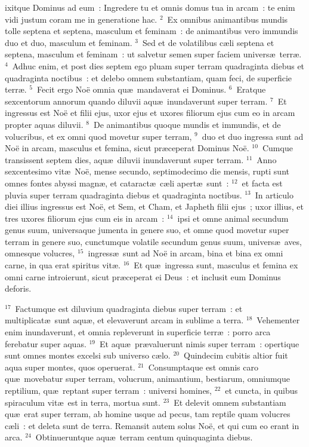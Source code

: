 \bchapter
{}ixitque Dominus ad eum~: Ingredere tu et omnis domus tua in arcam~: te enim vidi justum coram me in generatione hac.
${}^{2}$~Ex omnibus animantibus mundis tolle septena et septena, masculum et feminam~: de animantibus vero immundis duo et duo, masculum et feminam.
${}^{3}$~Sed et de volatilibus c\ae li septena et septena, masculum et feminam~: ut salvetur semen super faciem univers\ae\ terr\ae .
${}^{4}$~Adhuc enim, et post dies septem ego pluam super terram quadraginta diebus et quadraginta noctibus~: et delebo omnem substantiam, quam feci, de superficie terr\ae .
${}^{5}$~Fecit ergo No\"e omnia qu\ae\ mandaverat ei Dominus.
${}^{6}$~Eratque sexcentorum annorum quando diluvii aqu\ae\ inundaverunt super terram.
${}^{7}$~Et ingressus est No\"e et filii ejus, uxor ejus et uxores filiorum ejus cum eo in arcam propter aquas diluvii.
${}^{8}$~De animantibus quoque mundis et immundis, et de volucribus, et ex omni quod movetur super terram,
${}^{9}$~duo et duo ingressa sunt ad No\"e in arcam, masculus et femina, sicut pr\ae ceperat Dominus No\"e.
${}^{10}$~Cumque transissent septem dies, aqu\ae\ diluvii inundaverunt super terram.
${}^{11}$~Anno sexcentesimo vit\ae\ No\"e, mense secundo, septimodecimo die mensis, rupti sunt omnes fontes abyssi magn\ae , et cataract\ae\ c\ae li apert\ae\ sunt~:
${}^{12}$~et facta est pluvia super terram quadraginta diebus et quadraginta noctibus.
${}^{13}$~In articulo diei illius ingressus est No\"e, et Sem, et Cham, et Japheth filii ejus~; uxor illius, et tres uxores filiorum ejus cum eis in arcam~:
${}^{14}$~ipsi et omne animal secundum genus suum, universaque jumenta in genere suo, et omne quod movetur super terram in genere suo, cunctumque volatile secundum genus suum, univers\ae\ aves, omnesque volucres,
${}^{15}$~ingress\ae\ sunt ad No\"e in arcam, bina et bina ex omni carne, in qua erat spiritus vit\ae .
${}^{16}$~Et qu\ae\ ingressa sunt, masculus et femina ex omni carne introierunt, sicut pr\ae ceperat ei Deus~: et inclusit eum Dominus deforis.


${}^{17}$~Factumque est diluvium quadraginta diebus super terram~: et multiplicat\ae\ sunt aqu\ae , et elevaverunt arcam in sublime a terra.
${}^{18}$~Vehementer enim inundaverunt, et omnia repleverunt in superficie terr\ae~: porro arca ferebatur super aquas.
${}^{19}$~Et aqu\ae\ pr\ae valuerunt nimis super terram~: opertique sunt omnes montes excelsi sub universo c\ae lo.
${}^{20}$~Quindecim cubitis altior fuit aqua super montes, quos operuerat.
${}^{21}$~Consumptaque est omnis caro qu\ae\ movebatur super terram, volucrum, animantium, bestiarum, omniumque reptilium, qu\ae\ reptant super terram~: universi homines,
${}^{22}$~et cuncta, in quibus spiraculum vit\ae\ est in terra, mortua sunt.
${}^{23}$~Et delevit omnem substantiam qu\ae\ erat super terram, ab homine usque ad pecus, tam reptile quam volucres c\ae li~: et deleta sunt de terra. Remansit autem solus No\"e, et qui cum eo erant in arca.
${}^{24}$~Obtinueruntque aqu\ae\ terram centum quinquaginta diebus.

